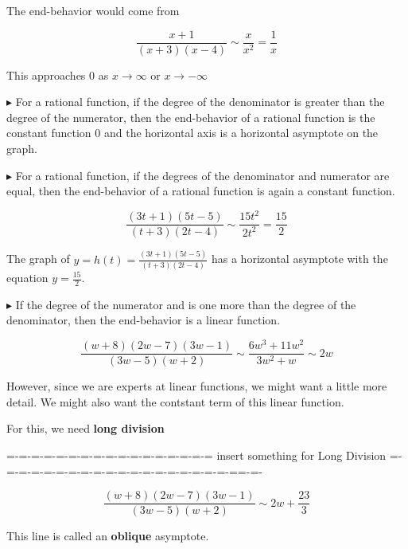 \documentclass{ximera}
\begin{document}
The end-behavior would come from 


\[ \frac{x+1}{(x+3)(x-4)}    \sim    \frac{x}{x^2} = \frac{1}{x}  \]


This approaches $0$ as $x \to \infty$ or $x \to -\infty$ 


$\blacktriangleright$   For a rational function, if the degree of the denominator is greater than the degree of the numerator, then the end-behavior of a rational function is the constant function $0$ and the horizontal axis is a horizontal asymptote on the graph.




$\blacktriangleright$   For a rational function, if the degrees of the denominator and numerator are equal, then the end-behavior of a rational function is again a constant function.


\[ \frac{(3t+1)(5t-5)}{(t+3)(2t-4)}    \sim    \frac{15t^2}{2t^2} = \frac{15}{2}  \]




The graph of $y = h(t) = \frac{(3t+1)(5t-5)}{(t+3)(2t-4)} $ has a horizontal asymptote with the equation $y = \frac{15}{2}$.




$\blacktriangleright$   If the degree of the numerator and is one more than the degree of the denominator, then the end-behavior is a linear function.


\[ \frac{(w+8)(2w-7)(3w-1)}{(3w-5)(w+2)}    \sim   \frac{6w^3 + 11w^2}{3w^2 + w} \sim 2w  \]
















\begin{center}
\end{center}







\begin{center}
\end{center}



However, since we are experts at linear functions, we might want a little more detail.  We might also want the contstant term of this linear function.  

For this, we need \textbf{long division}





=-=-=-=-=-=-=-=-=-=-=-=-=-=-=-=-=  insert something for Long Division =-=-=-=-=-=-=-=-=-=-=-=-=-=-=-=-=-=-=-==-=-



\[ \frac{(w+8)(2w-7)(3w-1)}{(3w-5)(w+2)}    \sim    2w + \frac{23}{3}  \]



\begin{center}
\end{center}

This line is called an \textbf{oblique} asymptote.
\end{document}
